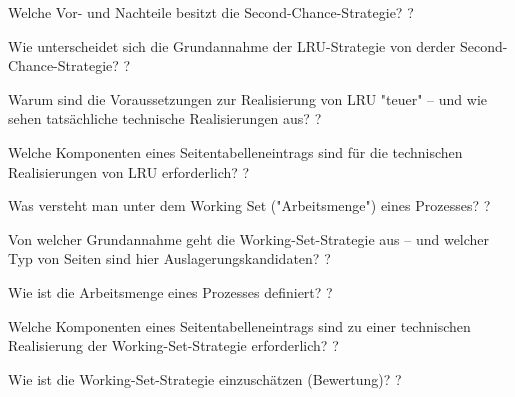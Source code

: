 \documentclass[avery5371]{flashcards}
\begin{document}
\begin{flashcard}[Speichermanagement]{Welche Vor- und Nachteile besitzt die Second-Chance-Strategie? }
    ?
\end{flashcard}

\begin{flashcard}[Speichermanagement]{Wie unterscheidet sich die Grundannahme der LRU-Strategie von derder Second-Chance-Strategie?}
    ?
\end{flashcard}

\begin{flashcard}[Speichermanagement]{Warum sind die Voraussetzungen zur Realisierung von LRU "teuer" – und wie sehen tatsächliche technische Realisierungen aus? }
    ?
\end{flashcard}

\begin{flashcard}[Speichermanagement]{Welche Komponenten eines Seitentabelleneintrags sind für die technischen Realisierungen von LRU erforderlich?}
    ?
\end{flashcard}

\begin{flashcard}[Speichermanagement]{Was versteht man unter dem Working Set ("Arbeitsmenge") eines Prozesses?}
    ?
\end{flashcard}

\begin{flashcard}[Speichermanagement]{Von welcher Grundannahme geht die Working-Set-Strategie aus – und welcher Typ von Seiten sind hier Auslagerungskandidaten? }
    ?
\end{flashcard}

\begin{flashcard}[Speichermanagement]{Wie ist die Arbeitsmenge eines Prozesses definiert? }
    ?
\end{flashcard}

\begin{flashcard}[Speichermanagement]{Welche Komponenten eines Seitentabelleneintrags sind zu einer technischen Realisierung der Working-Set-Strategie erforderlich? }
    ?
\end{flashcard}

\begin{flashcard}[Speichermanagement]{Wie ist die Working-Set-Strategie einzuschätzen (Bewertung)? }
    ?
\end{flashcard}
\end{document}
